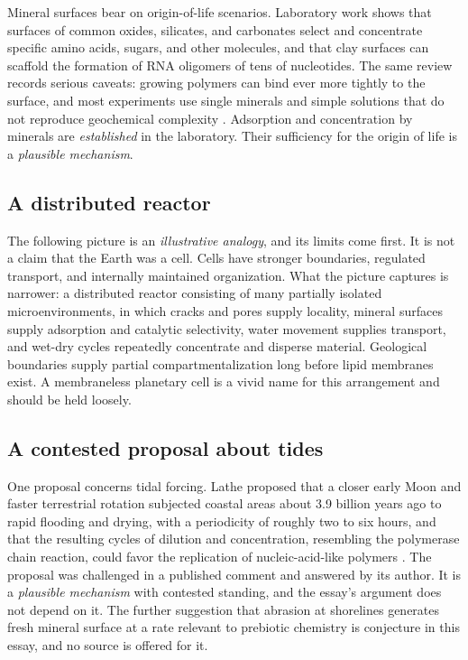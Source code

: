 \documentclass[11pt]{article}
\begin{document}
Mineral surfaces bear on origin-of-life scenarios. Laboratory work shows that surfaces of common oxides, silicates, and carbonates select and concentrate specific amino acids, sugars, and other molecules, and that clay surfaces can scaffold the formation of RNA oligomers of tens of nucleotides. The same review records serious caveats: growing polymers can bind ever more tightly to the surface, and most experiments use single minerals and simple solutions that do not reproduce geochemical complexity \cite{hazen2010}. Adsorption and concentration by minerals are \emph{established} in the laboratory. Their sufficiency for the origin of life is a \emph{plausible mechanism}.

\subsection{A distributed reactor}

The following picture is an \emph{illustrative analogy}, and its limits come first. It is not a claim that the Earth was a cell. Cells have stronger boundaries, regulated transport, and internally maintained organization. What the picture captures is narrower: a distributed reactor consisting of many partially isolated microenvironments, in which cracks and pores supply locality, mineral surfaces supply adsorption and catalytic selectivity, water movement supplies transport, and wet-dry cycles repeatedly concentrate and disperse material. Geological boundaries supply partial compartmentalization long before lipid membranes exist. A membraneless planetary cell is a vivid name for this arrangement and should be held loosely.

\subsection{A contested proposal about tides}

One proposal concerns tidal forcing. Lathe proposed that a closer early Moon and faster terrestrial rotation subjected coastal areas about 3.9 billion years ago to rapid flooding and drying, with a periodicity of roughly two to six hours, and that the resulting cycles of dilution and concentration, resembling the polymerase chain reaction, could favor the replication of nucleic-acid-like polymers \cite{lathe}. The proposal was challenged in a published comment \cite{varga} and answered by its author. It is a \emph{plausible mechanism} with contested standing, and the essay's argument does not depend on it. The further suggestion that abrasion at shorelines generates fresh mineral surface at a rate relevant to prebiotic chemistry is conjecture in this essay, and no source is offered for it.
\end{document}

